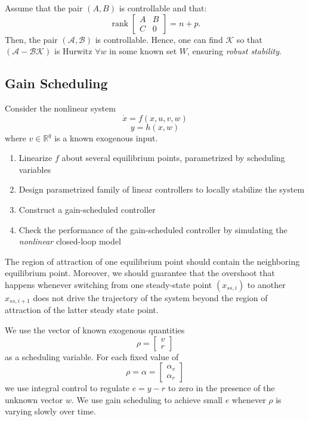 Assume that the pair $(A,B)$ is controllable and that:
\begin{equation*}
    \operatorname{rank} \begin{bmatrix} A & B \\ C & 0 \end{bmatrix} = n + p.
\end{equation*}
Then, the pair $(\mathcal{A}, \mathcal{B})$ is controllable.
\newpar{}
Hence, one can find $\mathcal{K}$ so that $(\mathcal{A} - \mathcal{B}\mathcal{K})$ is Hurwitz $\forall w$ in some known set $W$, ensuring \textit{robust stability}.

\subsection{Gain Scheduling}
Consider the nonlinear system
\begin{equation*}
    \dot{x} = f(x, u, v, w)
\end{equation*}
\begin{equation*}
    y = h(x, w)
\end{equation*}
where $v \in \mathbb{R}^q$ is a known exogenous input.

\newpar{}

\begin{enumerate}
    \item Linearize $f$ about several equilibrium points, parametrized by scheduling variables
    \item Design parametrized family of linear controllers to locally stabilize the system
    \item Construct a gain-scheduled controller
    \item Check the performance of the gain-scheduled controller by simulating the \textit{nonlinear} closed-loop model
\end{enumerate}
\newpar{}
The region of attraction of one equilibrium point should contain the neighboring equilibrium point.
Moreover, we should guarantee that the overshoot that happens whenever switching from one steady-state point $(x_{ss,i})$ to another $x_{ss,i+1}$ does not drive the trajectory of the system beyond the region of attraction of the latter steady state point.

\newpar{}

We use the vector of known exogenous quantities
\begin{equation*}
    \rho = \begin{bmatrix} v \\ r \end{bmatrix}
\end{equation*}
as a scheduling variable.
\newpar{}
For each fixed value of
\begin{equation*}
    \rho = \alpha = \begin{bmatrix} \alpha_v \\ \alpha_r \end{bmatrix}
\end{equation*}
we use integral control to regulate $e = y - r$ to zero in the presence of the unknown vector $w$.
\newpar{}
We use gain scheduling to achieve small $e$ whenever $\rho$ is varying slowly over time.

